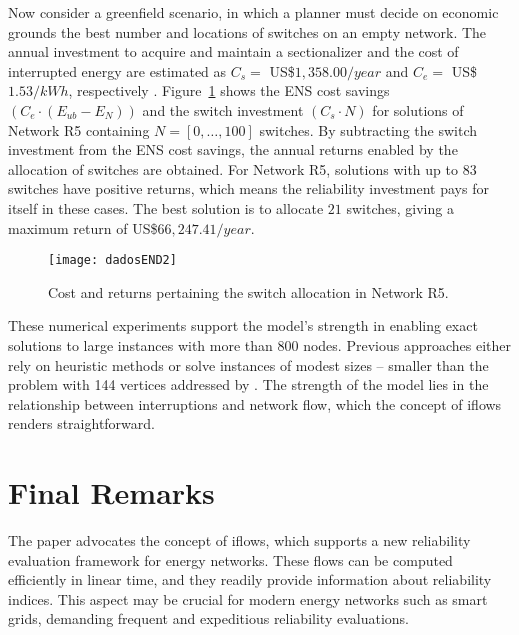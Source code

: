 \documentclass{article}
\begin{document}
Now consider a greenfield scenario, in which a planner must decide on economic grounds the best number and locations of switches on an empty network. The annual investment to acquire and maintain a sectionalizer and the cost of interrupted energy are estimated as $C_s =$ US\$$1,358.00/year$ and $C_e =$ US\$$1.53/kWh$, respectively \cite{brown2008}. Figure~\ref{fig:R5example} shows the ENS cost savings $(C_e \cdot (E_{ub} - E_N))$ and the switch investment $(C_s \cdot N)$ for solutions of Network R5 containing $N = [0,\ldots,100]$ switches. By subtracting the switch investment from the ENS cost savings, the annual returns enabled by the allocation of switches are obtained. For Network R5, solutions with up to $83$ switches have positive returns, which means the reliability investment pays for itself in these cases. The best solution is to allocate $21$ switches, giving a maximum return of US\$$66,247.41/year$.

\begin{figure}[hbtp]
	\begin{center}
	      \texttt{[image: dadosEND2]}
	\end{center}
\caption{Cost and returns pertaining the switch allocation in Network R5.}
\label{fig:R5example}
\end{figure}

These numerical experiments support the model's strength in enabling exact solutions to large instances with more than 800 nodes. Previous approaches either rely on heuristic methods or solve instances of modest sizes -- smaller than the problem with 144 vertices addressed  by \cite{FarajollahiFotuhiSafdarian2019}. The strength of the model lies in the relationship between interruptions and network flow, which the concept of iflows renders straightforward.



\vspace{-3.0mm}
\section{Final Remarks} \label{sec:Conclusions}

The paper advocates the concept of iflows, which supports a new reliability evaluation framework for energy networks. These flows can be computed efficiently in linear time, and they readily provide information about reliability indices. This aspect may be crucial for modern energy networks such as smart grids, demanding frequent and expeditious reliability evaluations.
\end{document}
